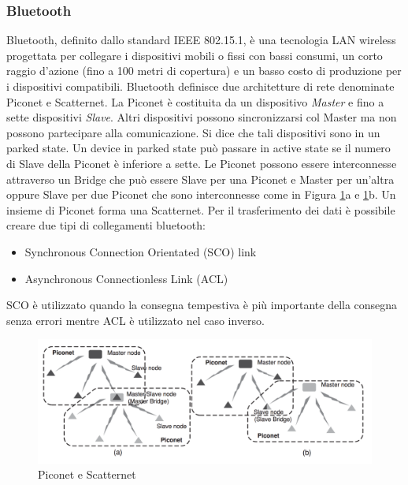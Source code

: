 \subsubsection{Bluetooth}
Bluetooth, definito dallo standard IEEE 802.15.1, è una tecnologia LAN wireless progettata per collegare i dispositivi mobili o fissi con bassi consumi, un corto raggio d'azione (fino a 100 metri di copertura) e un basso costo di produzione per i dispositivi compatibili. 
Bluetooth definisce due architetture di rete denominate Piconet e Scatternet. La Piconet è costituita da un dispositivo \emph{Master} e fino a sette dispositivi \emph{Slave}. Altri dispositivi possono sincronizzarsi col Master ma non possono partecipare alla comunicazione. Si dice che tali dispositivi sono in un parked state. Un device in parked state può passare in active state se il numero di Slave della Piconet è inferiore a sette. Le Piconet possono essere interconnesse attraverso un Bridge che può essere Slave per una Piconet e Master per un'altra oppure Slave per due Piconet che sono interconnesse come in Figura \ref{fig:bt}a e \ref{fig:bt}b. Un insieme di Piconet forma una Scatternet.\newpage
Per il trasferimento dei dati è possibile creare due tipi di collegamenti bluetooth:
\begin{itemize}
		\item Synchronous Connection Orientated (SCO) link
		\item Asynchronous Connectionless Link (ACL)
\end{itemize}
SCO è utilizzato quando la consegna tempestiva è più importante della consegna senza errori mentre ACL è utilizzato nel caso inverso.
\begin{figure}[h]
	\centering
	\includegraphics[scale=0.350]{imgs/bt.png}
	\caption{Piconet e Scatternet} \label{fig:bt}
\end{figure}
